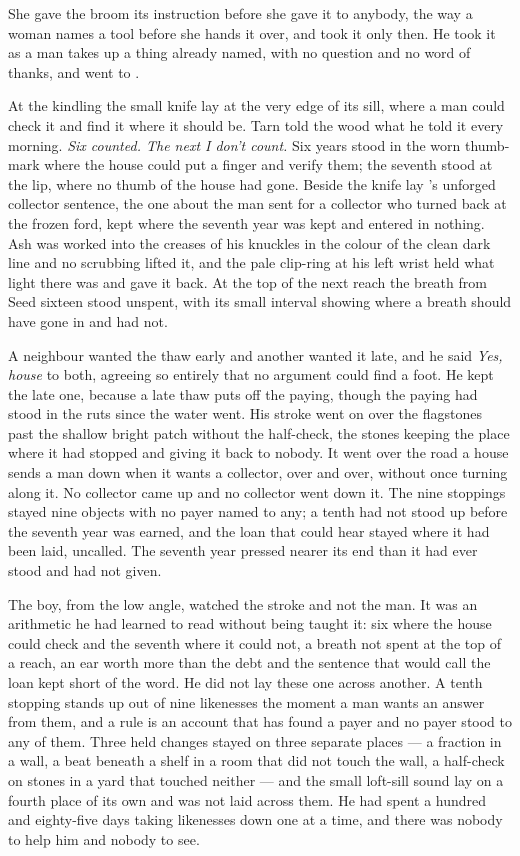 She gave the broom its instruction before she gave it to anybody, the way a woman names a tool before she hands it over, and  took it only then. He took it as a man takes up a thing already named, with no question and no word of thanks, and went to .

\scenebreak

At the kindling the small knife lay at the very edge of its sill, where a man could check it and find it where it should be. Tarn told the wood what he told it every morning. \emph{Six counted. The next I don't count.} Six years stood in the worn thumb-mark where the house could put a finger and verify them; the seventh stood at the lip, where no thumb of the house had gone. Beside the knife lay 's unforged collector sentence, the one about the man sent for a collector who turned back at the frozen ford, kept where the seventh year was kept and entered in nothing. Ash was worked into the creases of his knuckles in the colour of the clean dark line and no scrubbing lifted it, and the pale clip-ring at his left wrist held what light there was and gave it back. At the top of the next reach the breath from Seed sixteen stood unspent, with its small interval showing where a breath should have gone in and had not.

A neighbour wanted the thaw early and another wanted it late, and he said \emph{Yes, house} to both, agreeing so entirely that no argument could find a foot. He kept the late one, because a late thaw puts off the paying, though the paying had stood in the ruts since the water went. His stroke went on over the flagstones past the shallow bright patch without the half-check, the stones keeping the place where it had stopped and giving it back to nobody. It went over the road a house sends a man down when it wants a collector, over and over, without once turning along it. No collector came up  and no collector went down it. The nine stoppings stayed nine objects with no payer named to any; a tenth had not stood up before the seventh year was earned, and the loan that could hear stayed where it had been laid, uncalled. The seventh year pressed nearer its end than it had ever stood and had not given.

The boy, from the low angle, watched the stroke and not the man. It was an arithmetic he had learned to read without being taught it: six where the house could check and the seventh where it could not, a breath not spent at the top of a reach, an ear worth more than the debt and the sentence that would call the loan kept short of the word. He did not lay these one across another. A tenth stopping stands up out of nine likenesses the moment a man wants an answer from them, and a rule is an account that has found a payer and no payer stood to any of them. Three held changes stayed on three separate places --- a fraction in a wall, a beat beneath a shelf in a room that did not touch the wall, a half-check on stones in a yard that touched neither --- and the small loft-sill sound lay on a fourth place of its own and was not laid across them. He had spent a hundred and eighty-five days taking likenesses down one at a time, and there was nobody to help him and nobody to see.

